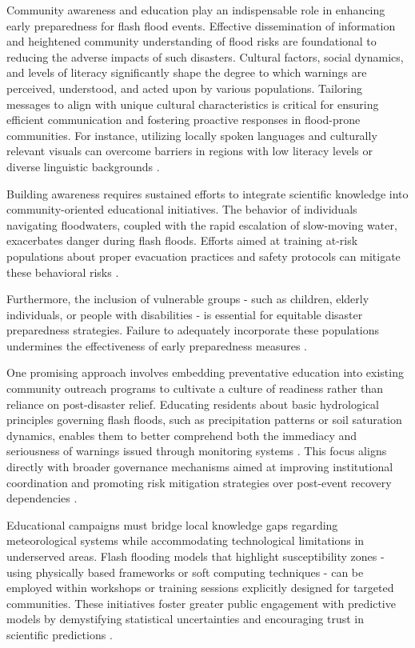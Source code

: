Community awareness and education play an indispensable role in enhancing early preparedness for flash flood events. Effective dissemination of information and heightened community understanding of flood risks are foundational to reducing the adverse impacts of such disasters. Cultural factors, social dynamics, and levels of literacy significantly shape the degree to which warnings are perceived, understood, and acted upon by various populations. Tailoring messages to align with unique cultural characteristics is critical for ensuring efficient communication and fostering proactive responses in flood-prone communities. For instance, utilizing locally spoken languages and culturally relevant visuals can overcome barriers in regions with low literacy levels or diverse linguistic backgrounds \citep{Msigwa2024}.

Building awareness requires sustained efforts to integrate scientific knowledge into community-oriented educational initiatives. The behavior of individuals navigating floodwaters, coupled with the rapid escalation of slow-moving water, exacerbates danger during flash floods. Efforts aimed at training at-risk populations about proper evacuation practices and safety protocols can mitigate these behavioral risks \citep{Henderson2020}. 

Furthermore, the inclusion of vulnerable groups - such as children, elderly individuals, or people with disabilities - is essential for equitable disaster preparedness strategies. Failure to adequately incorporate these populations undermines the effectiveness of early preparedness measures \citep{Msigwa2024}.

One promising approach involves embedding preventative education into existing community outreach programs to cultivate a culture of readiness rather than reliance on post-disaster relief. Educating residents about basic hydrological principles governing flash floods, such as precipitation patterns or soil saturation dynamics, enables them to better comprehend both the immediacy and seriousness of warnings issued through monitoring systems \citep{Yang2022}. This focus aligns directly with broader governance mechanisms aimed at improving institutional coordination and promoting risk mitigation strategies over post-event recovery dependencies \citep{Msigwa2024}.

Educational campaigns must bridge local knowledge gaps regarding meteorological systems while accommodating technological limitations in underserved areas. Flash flooding models that highlight susceptibility zones - using physically based frameworks or soft computing techniques - can be employed within workshops or training sessions explicitly designed for targeted communities. These initiatives foster greater public engagement with predictive models by demystifying statistical uncertainties and encouraging trust in scientific predictions \citep{Hinge2024}.

